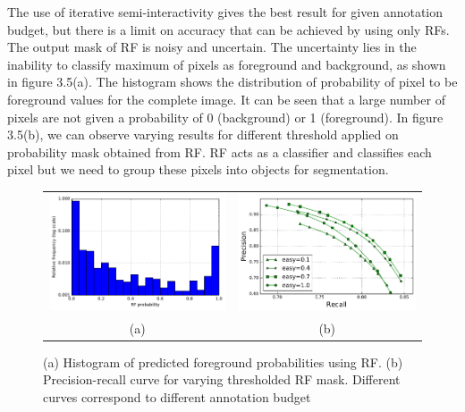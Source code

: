 The use of iterative semi-interactivity gives the best result for given annotation budget, but there is a limit on accuracy that can be achieved by using only RFs. The output mask of RF is noisy and uncertain. The uncertainty lies in the inability to classify maximum of pixels as foreground and background, as shown in figure 3.5(a). The histogram shows the distribution of probability of pixel to be foreground values for the complete image. It can be seen that a large number of pixels are not given a probability of 0 (background) or 1 (foreground). In figure 3.5(b), we can observe varying results for different threshold applied on probability mask obtained from RF. RF acts as a classifier and classifies each pixel but we need to group these pixels into objects for segmentation. 
\begin{figure}[h!] \label{fig:uncertain}
\begin{tabular}{cc}
 \includegraphics[width=0.5\linewidth]{figures/hist.pdf} & \includegraphics[width=0.5\linewidth]{figures/pr_curve.pdf} \\
  (a)  & (b) \\
\end{tabular}
\caption{(a) Histogram of predicted foreground probabilities using RF. (b) Precision-recall curve for varying thresholded RF mask. Different curves correspond to different annotation budget}
\end{figure}

